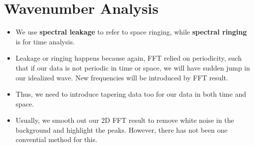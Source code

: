 \documentclass{article}
\begin{document}
\section{Wavenumber Analysis}
\begin{itemize}
    \item We use \textbf{spectral leakage} to refer to space ringing, while \textbf{spectral ringing} is for time analysis.
    \item Leakage or ringing happens because again, FFT relied on periodicity, such that if our data is not periodic in time or space, we will have sudden jump in our idealized wave. New frequencies will be introduced by FFT result.
    \item Thus, we need to introduce tapering data too for our data in both time and space.
    \item Usually, we smooth out our 2D FFT result to remove white noise in the background and highlight the peaks. However, there has not been one convential method for this.
\end{itemize}
\end{document}
